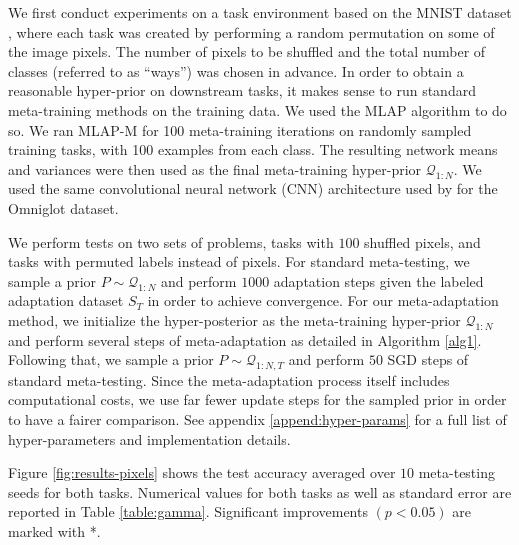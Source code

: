 \documentclass{article} %
\theoremstyle{definition}
\begin{document}
We first conduct experiments on a task environment based on the MNIST dataset \citep{LeCun1998}, where each task was created by performing a random permutation on some of the image pixels. The number of pixels to be shuffled and the total number of classes (referred to as ``ways'') was chosen in advance. In order to obtain a reasonable hyper-prior on downstream tasks, it makes sense to run standard meta-training methods on the training data.
We used the MLAP \citep{Amit2018} algorithm to do so. We ran MLAP-M for 100 meta-training iterations on randomly sampled training tasks, with 100 examples from each class. The resulting network means and variances were then used as the final meta-training hyper-prior $\mathcal{Q}_{1:N}$. We used the same convolutional neural network (CNN) architecture used by \citet{Vinyals2016} for the Omniglot dataset.

We perform tests on two sets of problems, tasks with $100$ shuffled pixels, and tasks with permuted labels instead of pixels.
For standard meta-testing, we sample a prior $P\sim \mathcal{Q}_{1:N}$ and perform $1000$ adaptation steps given the labeled adaptation dataset $S_T$ in order to achieve convergence. For our meta-adaptation method, we initialize the hyper-posterior as the meta-training hyper-prior $\mathcal{Q}_{1:N}$ and
 perform several steps of meta-adaptation as detailed in Algorithm \ref{alg1}. Following that, we sample a prior $P\sim \mathcal{Q}_{1:N,T}$ and perform  $50$ SGD steps of standard meta-testing. Since the meta-adaptation process itself includes computational costs, we use far fewer update steps for the sampled prior in order to have a fairer comparison.
See appendix \ref{append:hyper-params} for a full list of hyper-parameters and implementation details.

Figure \ref{fig:results-pixels} shows the test accuracy averaged over $10$ meta-testing seeds for both tasks.
Numerical values for both tasks as well as standard error are reported in Table \ref{table:gamma}. Significant improvements $(p<0.05)$ are marked with *.
\end{document}
